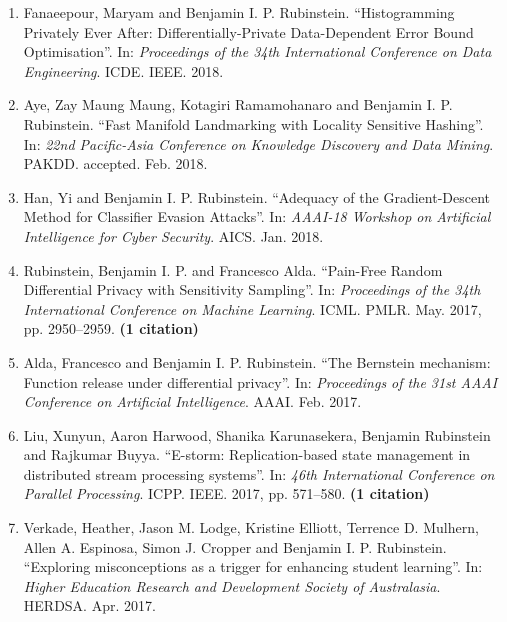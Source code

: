 \documentclass[a4paper,12pt]{article}
\begin{document}
\begin{enumerate}
\setcounter{enumi}{\value{list}}

\item Fanaeepour, Maryam and Benjamin I. P. Rubinstein.
``Histogramming Privately Ever After: Differentially-Private Data-Dependent Error Bound Optimisation''.
In: 
\emph{Proceedings of the 34th International Conference on Data Engineering}.
ICDE.
IEEE.
2018.

\item Aye, Zay Maung Maung, Kotagiri Ramamohanaro and Benjamin I. P. Rubinstein.
``Fast Manifold Landmarking with Locality Sensitive Hashing''.
In: 
\emph{22nd Pacific-Asia Conference on Knowledge Discovery and Data Mining}.
PAKDD.
accepted.
Feb. 2018.

\item Han, Yi and Benjamin I. P. Rubinstein.
``Adequacy of the Gradient-Descent Method for Classifier Evasion Attacks''.
In: 
\emph{AAAI-18 Workshop on Artificial Intelligence for Cyber Security}.
AICS.
Jan. 2018.

\item Rubinstein, Benjamin I. P. and Francesco Alda.
``Pain-Free Random Differential Privacy with Sensitivity Sampling''.
In: 
\emph{Proceedings of the 34th International Conference on Machine Learning}.
ICML.
PMLR.
May. 2017, pp. 2950--2959.
 \textbf{(1 citation)}
\item Alda, Francesco and Benjamin I. P. Rubinstein.
``The Bernstein mechanism: Function release under differential privacy''.
In: 
\emph{Proceedings of the 31st AAAI Conference on Artificial Intelligence}.
AAAI.
Feb. 2017.

\item Liu, Xunyun, Aaron Harwood, Shanika Karunasekera, Benjamin Rubinstein and Rajkumar Buyya.
``E-storm: Replication-based state management in distributed stream processing systems''.
In: 
\emph{46th International Conference on Parallel Processing}.
ICPP.
IEEE.
2017, pp. 571--580.
 \textbf{(1 citation)}
\item Verkade, Heather, Jason M. Lodge, Kristine Elliott, Terrence D. Mulhern, Allen A. Espinosa, Simon J. Cropper and Benjamin I. P. Rubinstein.
``Exploring misconceptions as a trigger for enhancing student learning''.
In: 
\emph{Higher Education Research and Development Society of Australasia}.
HERDSA.
Apr. 2017.


\end{enumerate}
\end{document}
